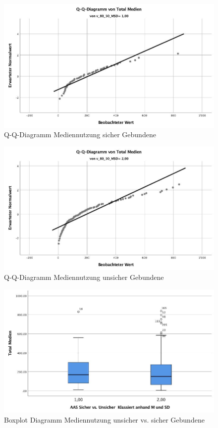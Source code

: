 \begin{figure}%
  \centering
     \includegraphics[scale=0.4]{content/Grafik/QQDiagramm_TotalMedien_SicherGebunden.jpg}
  \caption{Q-Q-Diagramm Mediennutzung sicher Gebundene}
  \label{fig:QQDiagrammSicherGebunden}
\end{figure}
\begin{figure}%
  \centering
     \includegraphics[scale=0.4]{content/Grafik/QQDiagramm_TotalMedien_UnsicherGebunden.jpg}
  \caption{Q-Q-Diagramm Mediennutzung unsicher Gebundene}
  \label{fig:QQDiagrammUnsicherGebunden}
\end{figure}

\begin{figure}%
  \centering
     \includegraphics[scale=0.4]{content/Grafik/Boxplot_TotalMedien_SicherUnsicherGebunden.jpg}
  \caption{Boxplot Diagramm Mediennutzung unsicher vs. sicher Gebundene}
  \label{fig:BoxplotDiagrammSicherUnsicherGebunden}
\end{figure}